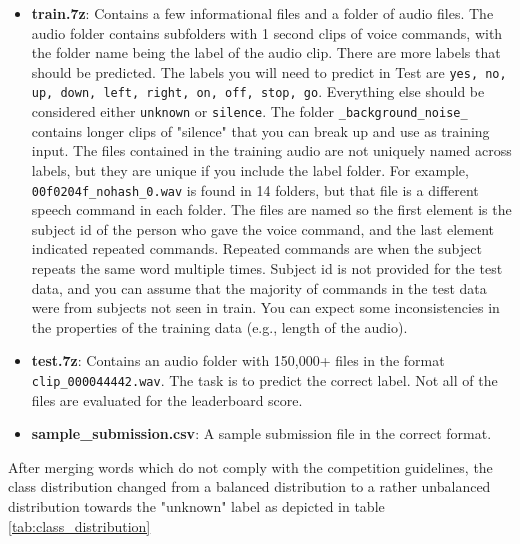 \documentclass{article}
\theoremstyle{definition}
\theoremstyle{remark}
\begin{document}
\begin{itemize}
	\item \textbf{train.7z}: Contains a few informational files and a folder of audio files. The audio folder contains subfolders with 1 second clips of voice commands, with the folder name being the label of the audio clip. There are more labels that should be predicted. The labels you will need to predict in Test are \texttt{yes, no, up, down, left, right, on, off, stop, go}. Everything else should be considered either \texttt{unknown} or \texttt{silence}. The folder \texttt{\_background\_noise\_} contains longer clips of "silence" that you can break up and use as training input. The files contained in the training audio are not uniquely named across labels, but they are unique if you include the label folder. For example, \texttt{00f0204f\_nohash\_0.wav} is found in 14 folders, but that file is a different speech command in each folder. The files are named so the first element is the subject id of the person who gave the voice command, and the last element indicated repeated commands. Repeated commands are when the subject repeats the same word multiple times. Subject id is not provided for the test data, and you can assume that the majority of commands in the test data were from subjects not seen in train. You can expect some inconsistencies in the properties of the training data (e.g., length of the audio).
	\item \textbf{test.7z}: Contains an audio folder with 150,000+ files in the format \texttt{clip\_000044442.wav}. The task is to predict the correct label. Not all of the files are evaluated for the leaderboard score.
	\item \textbf{sample\_submission.csv}: A sample submission file in the correct format.
\end{itemize}

After merging words which do not comply with the competition guidelines, the class distribution changed from a balanced distribution to a rather unbalanced distribution towards the "unknown" label as depicted in table \ref{tab:class_distribution}
\end{document}
